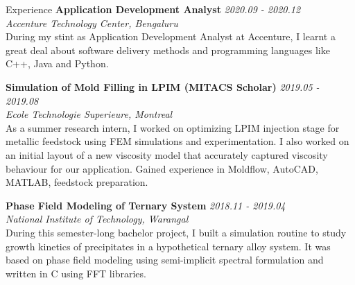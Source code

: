 \documentclass{resume} %
\begin{document}
\begin{rSection}{Experience}
{\bf Application Development Analyst} \hfill {\em 2020.09 - 2020.12}\\
{\em Accenture Technology Center, Bengaluru}\\
During my stint as Application Development Analyst at Accenture, I learnt a great deal about software delivery methods and programming languages like C++, Java and Python. 

{\bf Simulation of Mold Filling in LPIM (MITACS Scholar)} \hfill {\em 2019.05 - 2019.08}\\
{\em Ecole Technologie Superieure, Montreal}\\
As a summer research intern, I worked on optimizing LPIM injection stage for metallic feedstock using FEM simulations and experimentation. I also worked on an initial layout of a new viscosity model that accurately captured viscosity behaviour for our application. Gained experience in Moldflow, AutoCAD, MATLAB, feedstock preparation.

{\bf Phase Field Modeling of Ternary System} \hfill {\em 2018.11 - 2019.04}\\
{\em National Institute of Technology, Warangal}\\
During this semester-long bachelor project, I built a simulation routine to study growth kinetics of precipitates in a hypothetical ternary alloy system. It was based on phase field modeling using semi-implicit spectral formulation and written in C using FFT libraries.





\end{rSection}
\end{document}
